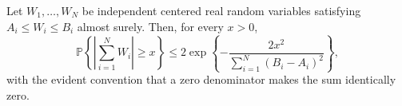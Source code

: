 Let \(W_1,\ldots,W_N\) be independent centered real random variables satisfying \(A_i\le W_i\le B_i\) almost surely. Then, for every \(x>0\),
\[
\mathbb P\left\{\left|\sum_{i=1}^N W_i\right|\ge x\right\}
\le2\exp\left\{-\frac{2x^2}{\sum_{i=1}^N(B_i-A_i)^2}\right\},
\]
with the evident convention that a zero denominator makes the sum identically zero.